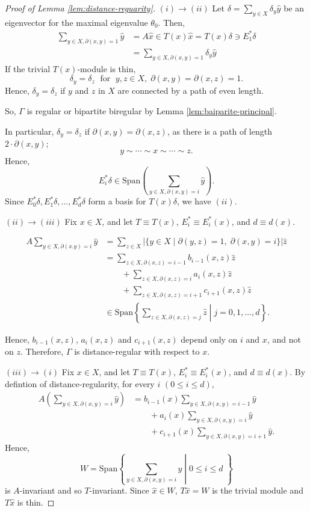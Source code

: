 \documentclass[
]{book}
\theoremstyle{definition}
\theoremstyle{definition}
\theoremstyle{definition}
\theoremstyle{definition}
\theoremstyle{remark}
\begin{document}
\begin{proof}[Proof of Lemma \ref{lem:distance-reguarity}]
\((i)\to (ii)\)
Let \(\delta = \sum_{y\in X}\delta_y\hat{y}\) be an eigenvector for the maximal eigenvalue \(\theta_0\). Then,
\begin{align}
\sum_{y\in X, \partial(x,y) = 1}\hat{y} & = A\hat{x} \in T(x)\hat{x} = T(x)\delta \ni E^*_1\delta\\
& = \sum_{y\in X, \partial(x,y)=1}\delta_y\hat{y}
\end{align}
If the trivial \(T(x)\)-module is thin,
\[\delta_y = \delta_z \; \text{ for }\; y, z\in X, \; \partial(x,y) = \partial(x,z) = 1.\]
Hence, \(\delta_y = \delta_z\) if \(y\) and \(z\) in \(X\) are connected by a path of even length.

So, \(\Gamma\) is regular or bipartite biregular by Lemma \ref{lem:baiparite-principal}.

In particular, \(\delta_y = \delta_z\) if \(\partial(x,y) = \partial(x,z)\), as there is a path of length \(2\cdot \partial(x,y)\);
\[y\sim \cdots \sim x \sim \cdots \sim z.\]
Hence,
\[E^*_i\delta \in \mathrm{Span}\left(\sum_{y\in X, \partial(x,y) = i}\hat{y}\right).\]
Since \(E^*_0\delta, E^*_1\delta, \ldots, E^*_d\delta\) form a basis for \(T(x)\delta\), we have \((ii)\).

\((ii)\to (iii)\)
Fix \(x\in X\), and let \(T \equiv T(x)\), \(E^*_i\equiv E^*_i(x)\), and \(d \equiv d(x)\).

\begin{align}
A\sum_{y\in X, \partial(x.y)=i}\hat{y} & = \sum_{z\in X} |\{y\in X \mid \partial(y,z) = 1, \; \partial(x,y) = i\}|\hat{z}\\
& = \sum_{z\in X, \partial(x,z) = i-1}b_{i-1}(x,z)\hat{z} \\
& \qquad + \sum_{z\in X, \partial(x,z) = i} a_{i}(x,z)\hat{z} \\
& \qquad + \sum_{z\in X, \partial(x,z) = i+1} c_{i+1}(x,z)\hat{z}\\
& \in \mathrm{Span}\left\{\left.\sum_{z\in X, \partial(x,z) = j}\hat{z} \; \right| \; j = 0, 1, \ldots, d \right\}.
\end{align}

Hence, \(b_{i-1}(x,z)\), \(a_i(x,z)\) and \(c_{i+1}(x,z)\) depend only on \(i\) and \(x\), and not on \(z\).
Therefore, \(\Gamma\) is distance-regular with respect to \(x\).

\((iii)\to (i)\)
Fix \(x\in X\), and let \(T \equiv T(x)\), \(E^*_i\equiv E^*_i(x)\), and \(d \equiv d(x)\).
By defintion of distance-regularity, for every \(i\) \((0\leq i\leq d)\),
\begin{align}
A\left(\sum_{y\in X, \partial(x,y)=i}\hat{y}\right) & = 
b_{i-1}(x)\sum_{y\in X, \partial(x,y) = i-1}\hat{y} \\
& \qquad + a_{i}(x)\sum_{y\in X, \partial(x,y) = i}\hat{y}\\
& \qquad + c_{i+1}(x)\sum_{y\in X, \partial(x,y) = i+1}\hat{y}.
\end{align}
Hence,
\[W = \mathrm{Span}\left\{\left.\sum_{y\in X, \partial(x,y)=i}\hat{y} \; \right| \; 0\leq i\leq d\; \right\}\]
is \(A\)-invariant and so \(T\)-invariant. Since \(\hat{x}\in W\), \(T\hat{x} = W\) is the trivial module and \(T\hat{x}\) is thin.
\end{proof}
\end{document}
